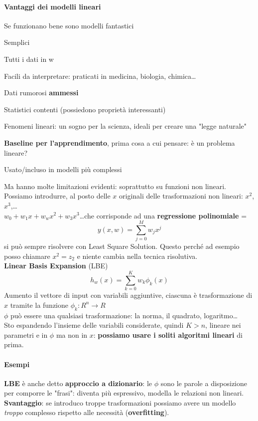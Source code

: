 \documentclass[10pt]{book}
\begin{document}
\paragraph{Vantaggi dei modelli lineari} Se funzionano bene sono modelli fantastici
\begin{list}{}{}
	\item Semplici
	\item Tutti i dati in w
	\item Facili da interpretare: praticati in medicina, biologia, chimica\ldots
	\item Dati rumorosi \textbf{ammessi}
	\item Statistici contenti (possiedono proprietà interessanti)
	\item Fenomeni lineari: un sogno per la scienza, ideali per creare una "legge naturale"
	\item \textbf{Baseline per l'apprendimento}, prima cosa a cui pensare: è un problema lineare?
	\item Usato/incluso in modelli più complessi
\end{list}
Ma hanno molte limitazioni evidenti: soprattutto su funzioni non lineari.\\
Possiamo introdurre, al posto delle $x$ originali delle trasformazioni non lineari: $x^2$, $x^3$,\ldots\\
$w_0 + w_1 x + w_w x^2 + w_3 x^3$\ldots che corrisponde ad una \textbf{regressione polinomiale} = $$y(x, w) = \sum_{j=0}^M w_j x^j$$ si può sempre risolvere con Least Square Solution. Questo perché ad esempio posso chiamare $x^2 = z_2$ e niente cambia nella tecnica risolutiva.\\
\textbf{Linear Basis Expansion} (LBE)
$$h_w(x) = \sum_{k=0}^K w_k \phi_k (x)$$
Aumento il vettore di input con variabili aggiuntive, ciascuna è trasformazione di $x$ tramite la funzione $\phi_k : R^n \rightarrow R$\\
$\phi$ può essere una qualsiasi trasformazione: la norma, il quadrato, logaritmo\ldots\\
Sto espandendo l'insieme delle variabili considerate, quindi $K > n$, lineare nei parametri e in $\phi$ ma non in $x$: \textbf{possiamo usare i soliti algoritmi lineari} di prima.
\paragraph{Esempi}
\textbf{LBE} è anche detto \textbf{approccio a dizionario}: le $\phi$ sono le parole a disposizione per comporre le "frasi": diventa più espressivo, modella le relazioni non lineari.\\
\textbf{Svantaggio}: se introduco troppe trasformazioni possiamo avere un modello \textit{troppo} complesso rispetto alle necessità (\textbf{overfitting}).
\end{document}
